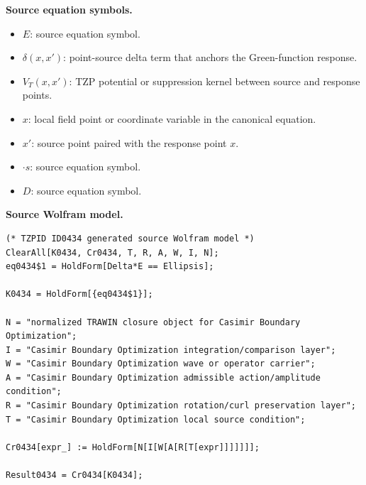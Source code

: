 \begin{minipage}[t]{0.49\linewidth}
\begingroup
\small
\raggedright
\textbf{Source equation symbols.}\par
\begin{itemize}[leftmargin=1.35em,itemsep=1pt,topsep=1pt,parsep=0pt]
    \item $E$: source equation symbol.
    \item $\delta(x,x')$: point-source delta term that anchors the Green-function response.
    \item $V_{T}(x,x')$: TZP potential or suppression kernel between source and response points.
    \item $x$: local field point or coordinate variable in the canonical equation.
    \item $x'$: source point paired with the response point $x$.
    \item $\cdot s$: source equation symbol.
    \item $D$: source equation symbol.
\end{itemize}
\endgroup
\end{minipage}\hfill
\begin{minipage}[t]{0.47\linewidth}
\begingroup
\scriptsize
\raggedright
\textbf{Source Wolfram model.}\par
\begin{Verbatim}[fontsize=\tiny,breaklines=true,breakanywhere=true]
(* TZPID ID0434 generated source Wolfram model *)
ClearAll[K0434, Cr0434, T, R, A, W, I, N];
eq0434$1 = HoldForm[Delta*E == Ellipsis];

K0434 = HoldForm[{eq0434$1}];

N = "normalized TRAWIN closure object for Casimir Boundary Optimization";
I = "Casimir Boundary Optimization integration/comparison layer";
W = "Casimir Boundary Optimization wave or operator carrier";
A = "Casimir Boundary Optimization admissible action/amplitude condition";
R = "Casimir Boundary Optimization rotation/curl preservation layer";
T = "Casimir Boundary Optimization local source condition";

Cr0434[expr_] := HoldForm[N[I[W[A[R[T[expr]]]]]]];

Result0434 = Cr0434[K0434];
\end{Verbatim}
\endgroup
\end{minipage}

